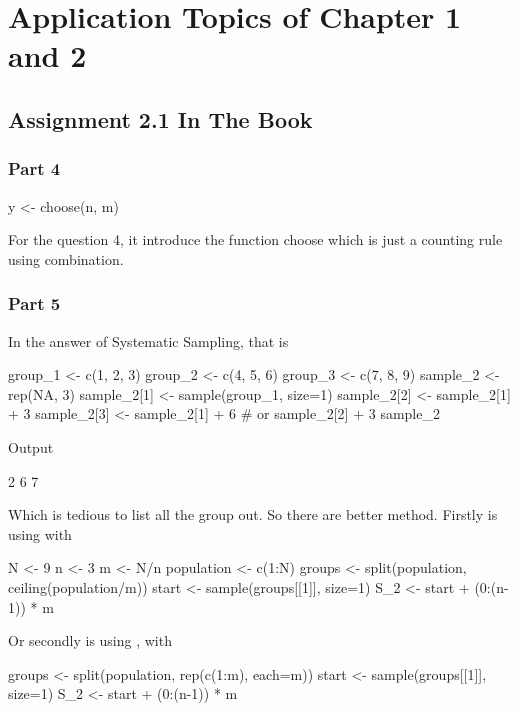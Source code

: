 \chapter{Application Topics of Chapter 1 and 2}
\section{Assignment 2.1 In The Book}
\subsection{Part 4}
\begin{Rblock}
    y <- choose(n, m) 
\end{Rblock}
For the question 4, it introduce the function choose which is just a counting rule using combination. 
\subsection{Part 5}
In the answer of Systematic Sampling, that is
\begin{Rblock}
    group_1 <- c(1, 2, 3)
    group_2 <- c(4, 5, 6)
    group_3 <- c(7, 8, 9)
    sample_2 <- rep(NA, 3)
    sample_2[1] <- sample(group_1, size=1)
    sample_2[2] <- sample_2[1] + 3
    sample_2[3] <- sample_2[1] + 6 # or sample_2[2] + 3
    sample_2
\end{Rblock}
Output 
\begin{Rblock}
    [1] 2 6 7
\end{Rblock}
Which is tedious to list all the group out. So there are better method. Firstly is using  with 
\begin{Rblock}
    N <- 9
    n <- 3
    m <- N/n
    population <- c(1:N)
    groups <- split(population, ceiling(population/m))
    start <- sample(groups[[1]], size=1)
    S_2 <- start + (0:(n-1)) * m
\end{Rblock}
Or secondly is using , with 
\begin{Rblock}
    groups <- split(population, rep(c(1:m), each=m))
    start <- sample(groups[[1]], size=1)
    S_2 <- start + (0:(n-1)) * m
\end{Rblock}
